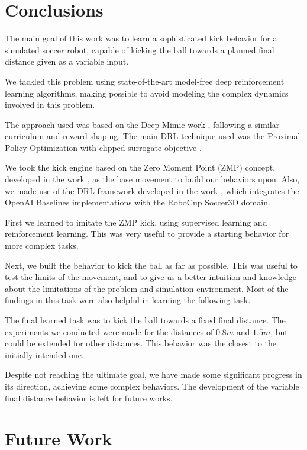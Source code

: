 

\section{Conclusions}

The main goal of this work was to learn a sophisticated kick behavior for a simulated soccer robot, capable of kicking the ball towards a planned final distance given as a variable input.

We tackled this problem using state-of-the-art model-free deep reinforcement learning algorithms, making possible to avoid modeling the complex dynamics involved in this problem.

The approach used was based on the Deep Mimic work \cite{deepmimic}, following a similar curriculum and reward shaping. The main DRL technique used was the Proximal Policy Optimization with clipped surrogate objective \cite{PPO}.

We took the kick engine based on the Zero Moment Point (ZMP) concept, developed in the work \cite{MestradoManga}, as the base movement to build our behaviors upon. Also, we made use of the DRL framework developed in the work \cite{TGMuzio}, which integrates the OpenAI Baselines \cite{baselines} implementations with the RoboCup Soccer3D domain.

First we learned to imitate the ZMP kick, using supervised learning and reinforcement learning. This was very useful to provide a starting behavior for more complex tasks.

Next, we built the behavior to kick the ball as far as possible. This was useful to test the limits of the movement, and to give us a better intuition and knowledge about the limitations of the problem and simulation environment. Most of the findings in this task were also helpful in learning the following task.

The final learned task was to kick the ball towards a fixed final distance. The experiments we conducted were made for the distances of $0.8m$ and $1.5m$, but could be extended for other distances. This behavior was the closest to the initially intended one.

Despite not reaching the ultimate goal, we have made some significant progress in its direction, achieving some complex behaviors. The development of the variable final distance behavior is left for future works.

\section{Future Work}

